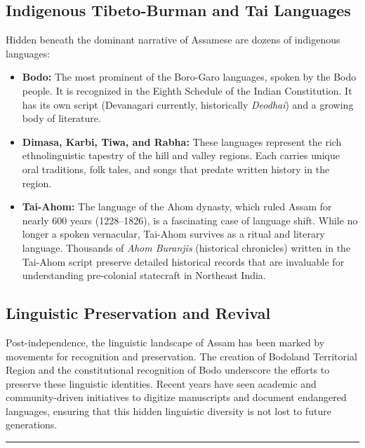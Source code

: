 \documentclass{article}
\begin{document}
\subsection{Indigenous Tibeto-Burman and Tai Languages}
Hidden beneath the dominant narrative of Assamese are dozens of indigenous languages:
\begin{itemize}
    \item \textbf{Bodo:} The most prominent of the Boro-Garo languages, spoken by the Bodo people. It is recognized in the Eighth Schedule of the Indian Constitution. It has its own script (Devanagari currently, historically \textit{Deodhai}) and a growing body of literature.
    \item \textbf{Dimasa, Karbi, Tiwa, and Rabha:} These languages represent the rich ethnolinguistic tapestry of the hill and valley regions. Each carries unique oral traditions, folk tales, and songs that predate written history in the region.
    \item \textbf{Tai-Ahom:} The language of the Ahom dynasty, which ruled Assam for nearly 600 years (1228–1826), is a fascinating case of language shift. While no longer a spoken vernacular, Tai-Ahom survives as a ritual and literary language. Thousands of \textit{Ahom Buranjis} (historical chronicles) written in the Tai-Ahom script preserve detailed historical records that are invaluable for understanding pre-colonial statecraft in Northeast India.
\end{itemize}

\subsection{Linguistic Preservation and Revival}
Post-independence, the linguistic landscape of Assam has been marked by movements for recognition and preservation. The creation of Bodoland Territorial Region and the constitutional recognition of Bodo underscore the efforts to preserve these linguistic identities. Recent years have seen academic and community-driven initiatives to digitize manuscripts and document endangered languages, ensuring that this hidden linguistic diversity is not lost to future generations.

\vspace{1em}
\rule{\textwidth}{0.4pt}
\end{document}
